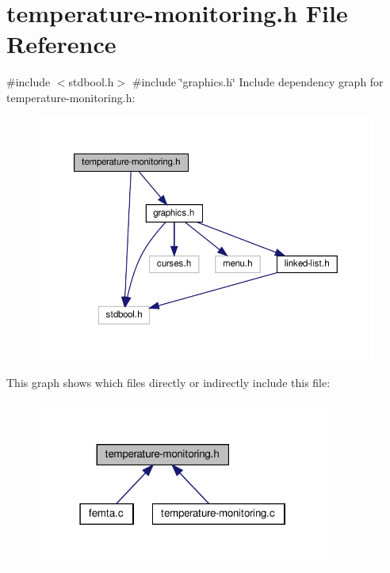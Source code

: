 \hypertarget{temperature-monitoring_8h}{}\section{temperature-\/monitoring.h File Reference}
\label{temperature-monitoring_8h}
{\ttfamily \#include $<$stdbool.\+h$>$}\newline
{\ttfamily \#include \char`\"{}graphics.\+h\char`\"{}}\newline
Include dependency graph for temperature-\/monitoring.h\+:
\nopagebreak
\begin{figure}[H]
\begin{center}
\leavevmode
\includegraphics[width=350pt]{temperature-monitoring_8h__incl}
\end{center}
\end{figure}
This graph shows which files directly or indirectly include this file\+:
\nopagebreak
\begin{figure}[H]
\begin{center}
\leavevmode
\includegraphics[width=274pt]{temperature-monitoring_8h__dep__incl}
\end{center}
\end{figure}
